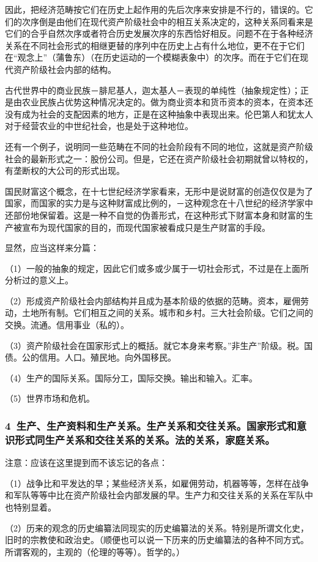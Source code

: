 \documentclass[a4paper,twoside,12pt,AutoFakeBold]{ctexart}
\begin{document}
因此，把经济范畴按它们在历史上起作用的先后次序来安排是不行的，错误的。它们的次序倒是由他们在现代资产阶级社会中的相互关系决定的，这种关系同看来是它们的合乎自然次序或者符合历史发展次序的东西恰好相反。问题不在于各种经济关系在不同社会形式的相继更替的序列中在历史上占有什么地位，更不在于它们在“观念上”（蒲鲁东）（在历史运动的一个模糊表象中）的次序。而在于它们在现代资产阶级社会内部的结构。

古代世界中的商业民族－腓尼基人，迦太基人－表现的单纯性（抽象规定性）；正是由农业民族占优势这种情况决定的。做为商业资本和货币资本的资本，在资本还没有成为社会的支配因素的地方，正是在这种抽象中表现出来。伦巴第人和犹太人对于经营农业的中世纪社会，也是处于这种地位。

还有一个例子，说明同一些范畴在不同的社会阶段有不同的地位，这就是资产阶级社会的最新形式之一：股份公司。但是，它还在资产阶级社会初期就曾以特权的，有垄断权的大公司的形式出现。

国民财富这个概念，在十七世纪经济学家看来，无形中是说财富的创造仅仅是为了国家，而国家的实力是与这种财富成比例的，－这种观念在十八世纪的经济学家中还部份地保留着。这是一种不自觉的伪善形式，在这种形式下财富本身和财富的生产被宣布为现代国家的目的，而现代国家被看成只是生产财富的手段。

显然，应当这样来分篇：

（1）一般的抽象的规定，因此它们或多或少属于一切社会形式，不过是在上面所分析过的意义上。

（2）形成资产阶级社会内部结构并且成为基本阶级的依据的范畴。资本，雇佣劳动，土地所有制。它们相互之间的关系。城市和乡村。三大社会阶级。它们之间的交换。流通。信用事业（私的）。

（3）资产阶级社会在国家形式上的概括。就它本身来考察。”非生产”阶级。税。国债。公的信用。人口。殖民地。向外国移民。

（4）生产的国际关系。国际分工，国际交换。输出和输入。汇率。

（5）世界市场和危机。

\subsubsection{4~生产、生产资料和生产关系。生产关系和交往关系。国家形式和意识形式同生产关系和交往关系的关系。法的关系，家庭关系。}

注意：应该在这里提到而不该忘记的各点：

（1）战争比和平发达的早；某些经济关系，如雇佣劳动，机器等等，怎样在战争和军队等等中比在资产阶级社会内部发展的早。生产力和交往关系的关系在军队中也特别显着。

（2）历来的观念的历史编纂法同现实的历史编纂法的关系。特别是所谓文化史，旧时的宗教使和政治史。（顺便也可以说一下历来的历史编纂法的各种不同方式。所谓客观的，主观的（伦理的等等）。哲学的。）
\end{document}
